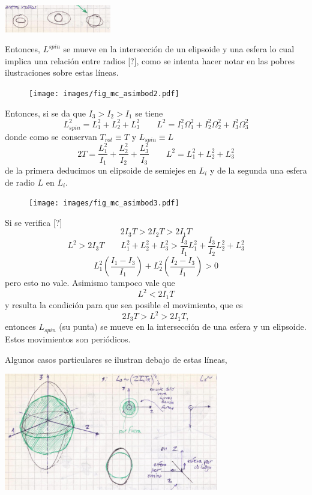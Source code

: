 \documentclass[10pt,oneside]{CBFT_book}
\begin{document}
\includegraphics[width=0.35\textwidth]{images/fig_mc_steiner_5.jpg}

Entonces, $L^{spin}$ se mueve en la intersección de un elipsoide y una esfera lo cual implica una relación entre
radios [?], como se intenta hacer notar en las pobres ilustraciones sobre estas líneas.

\begin{figure}[htb]
	\begin{center}
	\texttt{[image: images/fig\_mc\_asimbod2.pdf]}	 
	\end{center}
	\caption{}
\end{figure} 
Entonces, si se da que $I_3 > I_2 > I_1$ se tiene 
\[
	L_{spin}^2 = L_1^2 + L_2^2 + L_3^2 \qquad L^2 =  I_1^2\Omega_1^2 + I_2^2\Omega_2^2 + I_3^2\Omega_3^2
\]
donde como se conservan $T_{rot} \equiv T$ y $L_{spin} \equiv L$ 
\[
	2 T = \frac{L_1^2}{I_1} + \frac{L_2^2}{I_2} + \frac{L_3^2}{I_3} \qquad L^2 = L_1^2 + L_2^2 + L_3^2
\]
de la primera deducimos un elipsoide de semiejes en $L_i$ y de la segunda una esfera de radio $L$ en $L_i$.
\begin{figure}[htb]
	\begin{center}
	\texttt{[image: images/fig\_mc\_asimbod3.pdf]}	 
	\end{center}
	\caption{}
\end{figure} 

Si se verifica [?]
\[
	2 I_3 T > 2 I_2 T > 2 I_1 T
\]
\[
	L^2 > 2 I_3 T	\qquad L_1^2 + L_2^2 + L_3^2 > \frac{I_3}{I_1} L_1^2 + \frac{I_3}{I_2} L_2^2  + L_3^2
\]
\[
	L_1^2 \left( \frac{I_1 - I_3}{I_1} \right) + L_2^2 \left( \frac{I_2 - I_3}{I_1} \right)  > 0
\]
pero esto no vale. Asimismo tampoco vale que 
\[
	L^2 < 2 I_1 T
\]
y resulta la condición para que sea posible el movimiento, que es
\[
	2 I_3 T > L^2 > 2 I_1 T,
\]
entonces $L_{spin}$ (su punta) se mueve en la intersección de una esfera y un elipsoide.
Estos movimientos son periódicos.

Algunos casos particulares se ilustran debajo de estas líneas,

\includegraphics[width=0.7\textwidth]{images/fig_mc_steiner_6.jpg}
\end{document}
